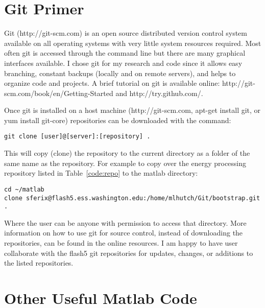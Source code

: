 \section{Git Primer}
\label{code:primer}

Git (http://git-scm.com) is an open source distributed version control system available on all operating systems with very little system resources required.
Most often git is accessed through the command line but there are many graphical interfaces available.
I chose git for my research and code since it allows easy branching, constant backups (locally and on remote servers), and helps to organize code and projects.
A brief tutorial on git is available online: http://git-scm.com/book/en/Getting-Started and http://try.github.com/.

Once git is installed on a host machine (http://git-scm.com, apt-get install git, or yum install git-core) repositories can be downloaded with the command:

\begin{verbatim}
git clone [user]@[server]:[repository] .
\end{verbatim}

This will copy (clone) the repository to the current directory as a folder of the same name as the repository. 
For example to copy over the energy processing repository listed in Table~\ref{code:repo} to the matlab directory:

\begin{verbatim}
cd ~/matlab
clone sferix@flash5.ess.washington.edu:/home/mlhutch/Git/bootstrap.git .
\end{verbatim}

Where the user can be anyone with permission to access that directory.
More information on how to use git for source control, instead of downloading the repositories, can be found in the online resources.
I am happy to have user collaborate with the flash5 git repositories for updates, changes, or additions to the listed repositories.

\section{Other Useful Matlab Code}
